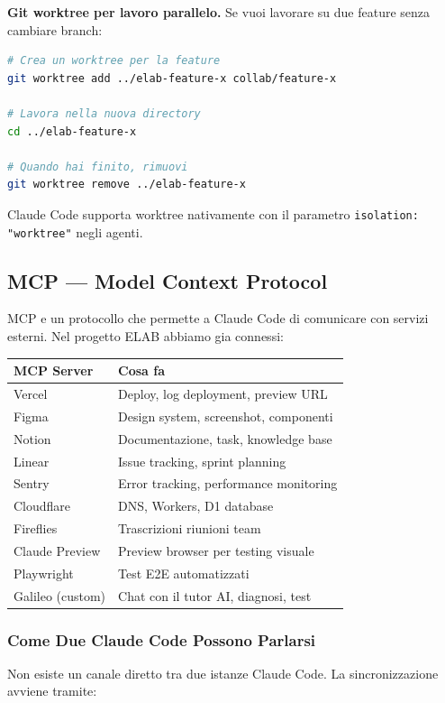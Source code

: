 \documentclass[11pt,a4paper]{article}
\begin{document}
\begin{consiglio}
\textbf{Git worktree per lavoro parallelo.} Se vuoi lavorare su due feature senza cambiare branch:
\begin{lstlisting}[language=bash]
# Crea un worktree per la feature
git worktree add ../elab-feature-x collab/feature-x

# Lavora nella nuova directory
cd ../elab-feature-x

# Quando hai finito, rimuovi
git worktree remove ../elab-feature-x
\end{lstlisting}
Claude Code supporta worktree nativamente con il parametro \texttt{isolation: "worktree"} negli agenti.
\end{consiglio}

\subsection{MCP --- Model Context Protocol}

MCP e un protocollo che permette a Claude Code di comunicare con servizi esterni. Nel progetto ELAB abbiamo gia connessi:

\begin{tabularx}{\textwidth}{lX}
\toprule
\textbf{MCP Server} & \textbf{Cosa fa} \\
\midrule
Vercel & Deploy, log deployment, preview URL \\
Figma & Design system, screenshot, componenti \\
Notion & Documentazione, task, knowledge base \\
Linear & Issue tracking, sprint planning \\
Sentry & Error tracking, performance monitoring \\
Cloudflare & DNS, Workers, D1 database \\
Fireflies & Trascrizioni riunioni team \\
Claude Preview & Preview browser per testing visuale \\
Playwright & Test E2E automatizzati \\
Galileo (custom) & Chat con il tutor AI, diagnosi, test \\
\bottomrule
\end{tabularx}

\subsubsection{Come Due Claude Code Possono Parlarsi}

Non esiste un canale diretto tra due istanze Claude Code. La sincronizzazione avviene tramite:
\end{document}
